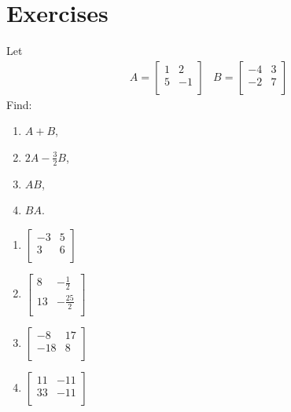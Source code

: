 \section{Exercises}
\begin{Exercise}
Let 
\begin{align*}
& A =
\begin{bmatrix}
1 & 2 \\
5 & -1 \\
\end{bmatrix}
& B =
\begin{bmatrix}
-4 & 3 \\
-2 & 7 \\
\end{bmatrix}
\end{align*}
Find:
\begin{enumerate}[label=(\alph*)]
\item $A+B$,
\item $2A-\frac{3}{2}B$,
\item $AB$,
\item $BA$.
\end{enumerate}
\end{Exercise}
\begin{Answer}
\begin{enumerate}[label=(\alph*)]
\item $\begin{bmatrix}
-3 & 5 \\
3 & 6 \\
\end{bmatrix}$
\item $\begin{bmatrix}
8 & -\frac{1}{2} \\
13 & -\frac{25}{2} \\
\end{bmatrix}$
\item $\begin{bmatrix}
-8 & 17 \\
-18 & 8 \\
\end{bmatrix}$
\item $\begin{bmatrix}
11 & -11 \\
33 & -11 \\
\end{bmatrix}$
\end{enumerate}   
\end{Answer}

